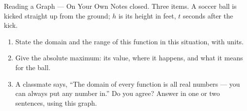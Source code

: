 \documentclass[10pt]{article}
\begin{document}

\vspace{0.15in}

\begin{notesbox}{Reading a Graph --- On Your Own}
\small
Notes closed. Three items. A soccer ball is kicked straight up from the ground; $h$ is its height
in feet, $t$ seconds after the kick.

\begin{center}
\end{center}

\begin{enumerate}[leftmargin=1.6em, itemsep=8pt, topsep=4pt]

\item State the domain and the range of this function in this situation, with units.


\item Give the absolute maximum: its value, where it happens, and what it means for the ball.


\item A classmate says, ``The domain of every function is all real numbers --- you can always put
any number in.'' Do you agree? Answer in one or two sentences, using this graph.


\end{enumerate}
\end{notesbox}
\end{document}
